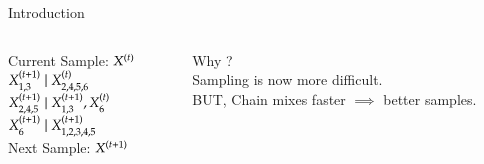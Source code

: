 \documentclass[serif,mathserif,final]{beamer}
\newcommand{\itemlinespace}{0.22in}
\begin{document}
\begin{frame}{}
\begin{columns}[t]
\begin{column}{0.49\linewidth}
\begin{block}{\Huge Introduction}
{\begin{columns}
        \begin{column}{5in}
            Current Sample: $X^{(t)}$\\
            \vspace{\itemlinespace}
            $X^{(t+1)}_{1,3} \;|\; X^{(t)}_{2, 4, 5, 6}$\\
            \vspace{\itemlinespace}
            $X^{(t+1)}_{2,4,5} \;|\; X^{(t+1)}_{1,3}, X^{(t)}_{6}$\\
            \vspace{\itemlinespace}
            $X^{(t+1)}_6 \;|\; X^{(t+1)}_{1, 2, 3, 4, 5}$\\
            \vspace{\itemlinespace}
            Next Sample: $X^{(t+1)}$\\
        \end{column}

        \begin{column}{5in}
            Why ?\\
            \vspace{\itemlinespace}
            Sampling is now more difficult. \\
            \vspace{\itemlinespace}
            BUT, Chain mixes faster $\implies$ better samples.
        \end{column}
        \end{columns}

}
\end{block}
\end{column}
\end{columns}
\end{frame}
\end{document}
